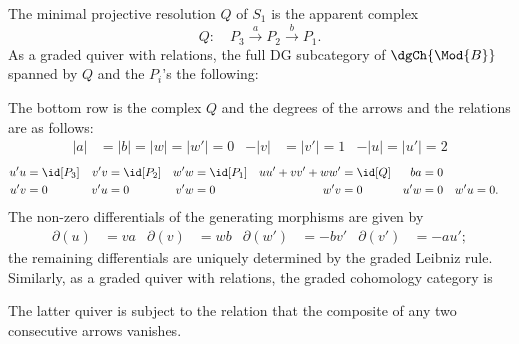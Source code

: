 \documentclass[a4paper]{amsart}
\begin{document}
The minimal projective resolution $Q$ of $S_1$ is the apparent
complex
\[
  Q\colon\quad P_3 \stackrel{a}{\to} P_2\stackrel{b}{\to} P_1.
\]
As a graded quiver with relations, the full DG subcategory of $\dgCh{\Mod{B}}$
spanned by $Q$ and the $P_i$'s the following:
\begin{center}
\end{center}
The bottom row is the complex $Q$ and the degrees of the arrows and the relations are as
follows:
\begin{align*}
  |a|&=|b|=|w|=|w'|=0 & -|v|&=|v'|=1 & -|u|=|u'|=2
\end{align*}
\begin{align*}
  u'u&=\id[P_3] & v'v&=\id[P_2] & w'w&=\id[P_1] & uu'+vv'+ww'&=\id[Q]&ba&=0\\
  u'v&=0 & v'u&=0 & v'w&=0 & w'v&=0 & u'w&=0 &w'u&=0.
\end{align*}
The non-zero differentials of the generating morphisms are given by
\begin{align*}
  \partial(u)&=va & \partial(v)&=wb & \partial(w')&=-bv' & \partial(v')&=-au';
\end{align*}
the remaining differentials are uniquely determined by the graded Leibniz rule.
Similarly, as a graded quiver with relations, the graded cohomology category is
\begin{center}
\end{center}
The latter quiver is subject to the relation that the composite of any two
consecutive arrows vanishes.
\end{document}
